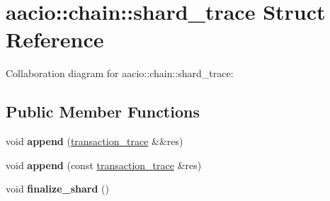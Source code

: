 \hypertarget{structaacio_1_1chain_1_1shard__trace}{}\section{aacio\+:\+:chain\+:\+:shard\+\_\+trace Struct Reference}
\label{structaacio_1_1chain_1_1shard__trace}


Collaboration diagram for aacio\+:\+:chain\+:\+:shard\+\_\+trace\+:
\subsection*{Public Member Functions}
\begin{DoxyCompactItemize}
\item 
\mbox{\label{structaacio_1_1chain_1_1shard__trace_af4147937e5e75deb576a993cbb49961e}} 
void {\bfseries append} (\mbox{\hyperlink{structaacio_1_1chain_1_1transaction__trace}{transaction\+\_\+trace}} \&\&res)
\item 
\mbox{\label{structaacio_1_1chain_1_1shard__trace_ac267230fcfcca23d58275fa13224d6f0}} 
void {\bfseries append} (const \mbox{\hyperlink{structaacio_1_1chain_1_1transaction__trace}{transaction\+\_\+trace}} \&res)
\item 
\mbox{\label{structaacio_1_1chain_1_1shard__trace_a6053befb60381739ab44d055af24f9bb}} 
void {\bfseries finalize\+\_\+shard} ()
\end{DoxyCompactItemize}
